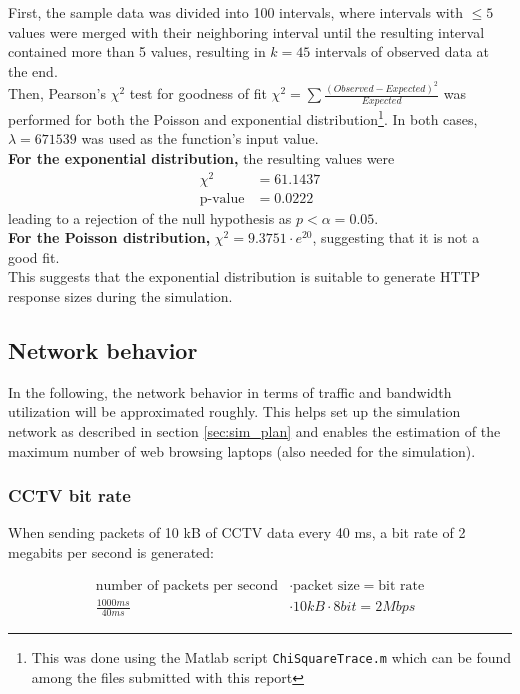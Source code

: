 \documentclass[
10pt, %
a4paper, %
oneside, %
headinclude,footinclude, %
BCOR5mm, %
]{scrartcl}
\begin{document}
First, the sample data was divided into 100 intervals, where intervals with $\leq 5$ values were merged with their neighboring interval until the resulting interval contained more than 5 values, resulting in $k = 45$ intervals of observed data at the end.\\

Then, Pearson's $\chi^2$ test for goodness of fit $\chi^2 = \sum \frac{(Observed - Expected)^2}{Expected}$ was performed for both the Poisson and exponential distribution\footnote{This was done using the Matlab script \texttt{ChiSquareTrace.m} which can be found among the files submitted with this report}. In both cases, $\lambda = 671539$ was used as the function's input value.\\

\textbf{For the exponential distribution,} the resulting values were
\begin{align*}
\chi^2 &= 61.1437\\
\text{p-value} &= 0.0222
\end{align*}
leading to a rejection of the null hypothesis as $p < \alpha = 0.05$.\\
\textbf{For the Poisson distribution,} $\chi^2 = 9.3751 \cdot e^{20}$, suggesting that it is not a good fit.\\

This suggests that the exponential distribution is suitable to generate HTTP response sizes during the simulation.


\subsection{Network behavior}
In the following, the network behavior in terms of traffic and bandwidth utilization will be approximated roughly.
This helps set up the simulation network as described in section \ref{sec:sim_plan} and enables the estimation of the maximum number of web browsing laptops (also needed for the simulation).

\subsubsection{CCTV bit rate}
When sending packets of 10 kB of CCTV data every 40 ms, a bit rate of 2 megabits per second is generated:

\begin{align*}
\text{number of packets per second} &\cdot \text{packet size} = \text{bit rate}\\
\frac{1000ms}{40ms} &\cdot 10kB \cdot 8 bit = 2Mbps
\end{align*}
\end{document}
